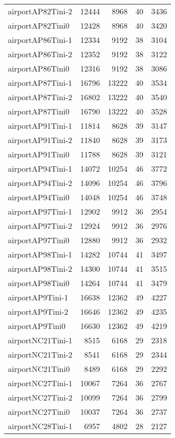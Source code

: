 \begin{longtable}{lrrrr}
airportAP82Tini-2 & 12444 & 8968 & 40 & 3436 \\
airportAP82Tini0 & 12428 & 8968 & 40 & 3420 \\
airportAP86Tini-1 & 12334 & 9192 & 38 & 3104 \\
airportAP86Tini-2 & 12352 & 9192 & 38 & 3122 \\
airportAP86Tini0 & 12316 & 9192 & 38 & 3086 \\
airportAP87Tini-1 & 16796 & 13222 & 40 & 3534 \\
airportAP87Tini-2 & 16802 & 13222 & 40 & 3540 \\
airportAP87Tini0 & 16790 & 13222 & 40 & 3528 \\
airportAP91Tini-1 & 11814 & 8628 & 39 & 3147 \\
airportAP91Tini-2 & 11840 & 8628 & 39 & 3173 \\
airportAP91Tini0 & 11788 & 8628 & 39 & 3121 \\
airportAP94Tini-1 & 14072 & 10254 & 46 & 3772 \\
airportAP94Tini-2 & 14096 & 10254 & 46 & 3796 \\
airportAP94Tini0 & 14048 & 10254 & 46 & 3748 \\
airportAP97Tini-1 & 12902 & 9912 & 36 & 2954 \\
airportAP97Tini-2 & 12924 & 9912 & 36 & 2976 \\
airportAP97Tini0 & 12880 & 9912 & 36 & 2932 \\
airportAP98Tini-1 & 14282 & 10744 & 41 & 3497 \\
airportAP98Tini-2 & 14300 & 10744 & 41 & 3515 \\
airportAP98Tini0 & 14264 & 10744 & 41 & 3479 \\
airportAP9Tini-1 & 16638 & 12362 & 49 & 4227 \\
airportAP9Tini-2 & 16646 & 12362 & 49 & 4235 \\
airportAP9Tini0 & 16630 & 12362 & 49 & 4219 \\
airportNC21Tini-1 & 8515 & 6168 & 29 & 2318 \\
airportNC21Tini-2 & 8541 & 6168 & 29 & 2344 \\
airportNC21Tini0 & 8489 & 6168 & 29 & 2292 \\
airportNC27Tini-1 & 10067 & 7264 & 36 & 2767 \\
airportNC27Tini-2 & 10099 & 7264 & 36 & 2799 \\
airportNC27Tini0 & 10037 & 7264 & 36 & 2737 \\
airportNC28Tini-1 & 6957 & 4802 & 28 & 2127 \\

\end{longtable}
